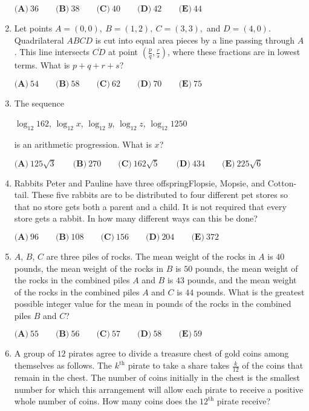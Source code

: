 \documentclass{article}
\begin{document}
\begin{enumerate}[label=\arabic*., itemsep=0.5em]
$ \textbf{(A)}\ 36\qquad\textbf{(B)}\ 38\qquad\textbf{(C)}\ 40\qquad\textbf{(D)}\ 42\qquad\textbf{(E)}\ 44$\par \vspace{0.5em}\item Let points $ A = (0,0) , \ B = (1,2), \ C = (3,3), $ and $ D = (4,0) $. Quadrilateral $ ABCD $ is cut into equal area pieces by a line passing through $ A $. This line intersects $ \overline{CD} $ at point $ \left (\frac{p}{q}, \frac{r}{s} \right ) $, where these fractions are in lowest terms. What is $ p + q + r + s $?

$ \textbf{(A)} \ 54 \qquad \textbf{(B)} \ 58 \qquad  \textbf{(C)} \ 62 \qquad \textbf{(D)} \ 70 \qquad \textbf{(E)} \ 75 $\par \vspace{0.5em}\item The sequence

$\log_{12}{162}$, $\log_{12}{x}$, $\log_{12}{y}$, $\log_{12}{z}$, $\log_{12}{1250}$

is an arithmetic progression. What is $x$?

$ \textbf{(A)} \ 125\sqrt{3} \qquad \textbf{(B)} \ 270 \qquad \textbf{(C)} \ 162\sqrt{5} \qquad \textbf{(D)} \ 434 \qquad \textbf{(E)} \ 225\sqrt{6}$\par \vspace{0.5em}\item Rabbits Peter and Pauline have three offspringFlopsie, Mopsie, and Cotton-tail. These five rabbits are to be distributed to four different pet stores so that no store gets both a parent and a child. It is not required that every store gets a rabbit. In how many different ways can this be done?

$\textbf{(A)} \ 96 \qquad  \textbf{(B)} \ 108 \qquad  \textbf{(C)} \ 156 \qquad  \textbf{(D)} \ 204 \qquad  \textbf{(E)} \ 372 $\par \vspace{0.5em}\item $A$, $B$, $C$ are three piles of rocks. The mean weight of the rocks in $A$ is $40$ pounds, the mean weight of the rocks in $B$ is $50$ pounds, the mean weight of the rocks in the combined piles $A$ and $B$ is $43$ pounds, and the mean weight of the rocks in the combined piles $A$ and $C$ is $44$ pounds. What is the greatest possible integer value for the mean in pounds of the rocks in the combined piles $B$ and $C$?

$ \textbf{(A)} \ 55 \qquad \textbf{(B)} \ 56 \qquad \textbf{(C)} \ 57 \qquad \textbf{(D)} \ 58 \qquad \textbf{(E)} \ 59$\par \vspace{0.5em}\item A group of $ 12 $ pirates agree to divide a treasure chest of gold coins among themselves as follows. The $ k^\text{th} $ pirate to take a share takes $ \frac{k}{12} $ of the coins that remain in the chest. The number of coins initially in the chest is the smallest number for which this arrangement will allow each pirate to receive a positive whole number of coins. How many coins does the $ 12^{\text{th}} $ pirate receive?


\end{enumerate}
\end{document}
